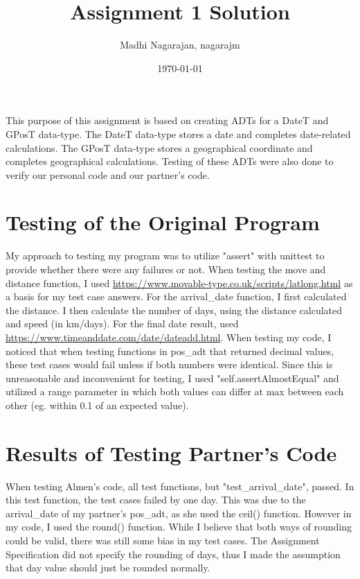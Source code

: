 \documentclass[12pt]{article}
\title{Assignment 1 Solution}
\author{Madhi Nagarajan, nagarajm}
\date{\today}
\begin{document}
\maketitle

This purpose of this assignment is based on creating ADTs for a DateT and GPosT data-type. The DateT data-type stores a date and completes date-related calculations. The GPosT data-type stores a geographical coordinate and completes geographical calculations. Testing of these ADTs were also done to verify our personal code and our partner's code.

\section{Testing of the Original Program}

My approach to testing my program was to utilize "assert" with unittest to provide whether there were any failures or not. When testing the move and distance function, I used \url{https://www.movable-type.co.uk/scripts/latlong.html} as a basis for my test case answers. For the arrival\_date function, I first calculated the distance. I then calculate the number of days, using the distance calculated and speed (in km/days). For the final date result, used \url{https://www.timeanddate.com/date/dateadd.html}.
\newline
When testing my code, I noticed that when testing functions in pos\_adt that returned decimal values, these test cases would fail unless if both numbers were identical. Since this is unreasonable and inconvenient for testing, I used "self.assertAlmostEqual" and utilized a range parameter in which both values can differ at max between each other (eg. within 0.1 of an expected value).

\section{Results of Testing Partner's Code}

When testing Almen's code, all test functions, but "test\_arrival\_date", passed. In this test function, the test cases failed by one day. This was due to the arrival\_date of my partner's pos\_adt, as she used the ceil() function. However in my code, I used the round() function. While I believe that both ways of rounding could be valid, there was still some bias in my test cases. The Assignment Specification did not specify the rounding of days, thus I made the assumption that day value should just be rounded normally.
\end{document}
